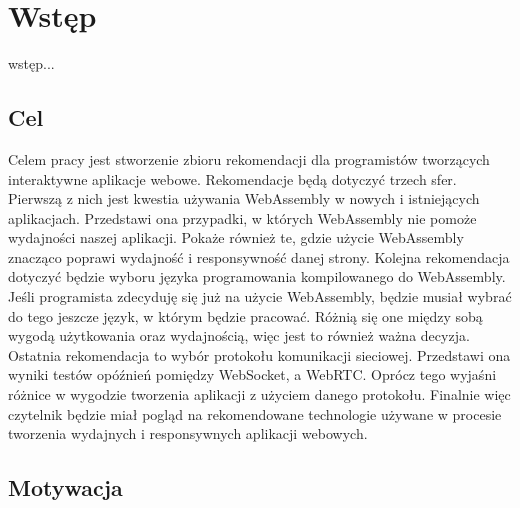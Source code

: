 \documentclass[language=polish,type=master]{aghmodern}
\author{Piotr Szczygieł}
\date{2022}
\begin{document}
\frontmatter
\maketitle
\tableofcontents

\mainmatter

\onehalfspacing

\chapter{Wstęp}

wstęp...

\section{Cel}

Celem pracy jest stworzenie zbioru rekomendacji dla programistów tworzących interaktywne aplikacje webowe.
Rekomendacje będą dotyczyć trzech sfer.
Pierwszą z nich jest kwestia używania WebAssembly w nowych i istniejących aplikacjach.
Przedstawi ona przypadki, w których WebAssembly nie pomoże wydajności naszej aplikacji.
Pokaże również te, gdzie użycie WebAssembly znacząco poprawi wydajność i responsywność danej strony.
Kolejna rekomendacja dotyczyć będzie wyboru języka programowania kompilowanego do WebAssembly.
Jeśli programista zdecyduję się już na użycie WebAssembly, będzie musiał wybrać do tego jeszcze język, w którym będzie pracować.
Różnią się one między sobą wygodą użytkowania oraz wydajnością, więc jest to również ważna decyzja.
Ostatnia rekomendacja to wybór protokołu komunikacji sieciowej.
Przedstawi ona wyniki testów opóźnień pomiędzy WebSocket, a WebRTC.
Oprócz tego wyjaśni różnice w wygodzie tworzenia aplikacji z użyciem danego protokołu.
Finalnie więc czytelnik będzie miał pogląd na rekomendowane technologie używane w procesie tworzenia wydajnych i responsywnych aplikacji webowych.

\section{Motywacja}
\end{document}
